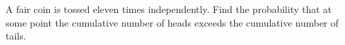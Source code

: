 A fair coin is tossed eleven times independently. Find the probability that at some point the cumulative number of heads exceeds the cumulative number of tails.
